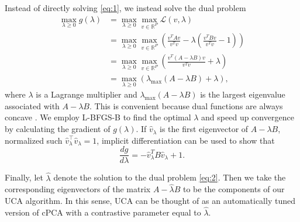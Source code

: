\documentclass[12pt]{article}
\begin{document}
Instead of directly solving \eqref{eq:1}, we instead solve the dual problem
\begin{align}
  \max_{\lambda \geq 0}{g(\lambda)} &= \max_{\lambda \geq 0}{\max_{v\in \mathbb{R}^P}{\mathcal{L}}}\left(v,\lambda\right) \nonumber\\
                                    &= \max_{\lambda \geq 0}{\max_{v\in \mathbb{R}^P}{\left( \frac{v^TAv}{v^T v} - \lambda\left(\frac{v^TBv}{v^T v} - 1\right)\right)}} \nonumber\\
                                    &= \max_{\lambda \geq 0}{\max_{v\in \mathbb{R}^P}{\left(\frac{v^T\left(A - \lambda B\right)v}{v^T v} + \lambda\right)}}\nonumber\\
                                        &= \max_{\lambda \geq 0}{\left(\lambda_{\text{max}}\left(A - \lambda B\right) + \lambda\right)}, \label{eq:2}
\end{align}
where $\lambda$ is a Lagrange multiplier and $\lambda_{\max}(A - \lambda B)$ is the largest eigenvalue associated with $A - \lambda B$. This is convenient because dual functions are always concave \cite{boyd2004convex}. We employ L-BFGS-B \cite{byrd1995limited} to find the optimal $\lambda$ and speed up convergence by calculating the gradient of $g(\lambda)$. If $\hat{v}_\lambda$ is the first eigenvector of $A - \lambda B$, normalized such $\hat{v}_{\lambda}^\top \hat{v}_{\lambda} = 1$, implicit differentiation can be used to show that
\[
  \frac{d g}{d \lambda} = - \hat{v}^T _{\lambda} B \hat{v}_{\lambda} + 1.
\]

Finally, let $\hat{\lambda}$ denote the solution to the dual problem \eqref{eq:2}. Then we take the corresponding eigenvectors of the matrix $A - \hat{\lambda} B$ to be the components of our UCA algorithm. In this sense, UCA can be thought of as an automatically tuned version of cPCA with a contrastive parameter equal to $\hat{\lambda}$.



\end{document}

